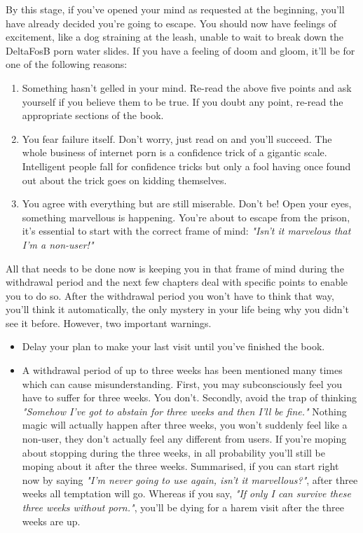 \documentclass[easypeasy]{subfiles}
\begin{document}
By this stage, if you've opened your mind as requested at the beginning, you'll have already decided you're going to escape. You should now have feelings of excitement, like a dog straining at the leash, unable to wait to break down the DeltaFosB porn water slides. If you have a feeling of doom and gloom, it'll be for one of the following reasons:
\begin{enumerate}
  \item Something hasn't gelled in your mind. Re-read the above five points and ask yourself if you believe them to be true. If you doubt any point, re-read the appropriate sections of the book.

  \item You fear failure itself. Don't worry, just read on and you'll succeed. The whole business of internet porn is a confidence trick of a gigantic scale. Intelligent people fall for confidence tricks but only a fool having once found out about the trick goes on kidding themselves.

  \item You agree with everything but are still miserable. Don't be! Open your eyes, something marvellous is happening. You're about to escape from the prison, it's essential to start with the correct frame of mind: \textit{"Isn't it marvelous that I'm a non-user!"}
  \end{enumerate}

All that needs to be done now is keeping you in that frame of mind during the withdrawal period and the next few chapters deal with specific points to enable you to do so. After the withdrawal period you won't have to think that way, you'll think it automatically, the only mystery in your life being why you didn't see it before. However, two important warnings.

  \begin{itemize}
  \item Delay your plan to make your last visit until you've finished the book.
  \item A withdrawal period of up to three weeks has been mentioned many times which can cause misunderstanding. First, you may subconsciously feel you have to suffer for three weeks. You don't. Secondly, avoid the trap of thinking \textit{"Somehow I've got to abstain for three weeks and then I'll be fine."} Nothing magic will actually happen after three weeks, you won't suddenly feel like a non-user, they don't actually feel any different from users. If you're moping about stopping during the three weeks, in all probability you'll still be moping about it after the three weeks. Summarised, if you can start right now by saying \textit{"I'm never going to use again, isn't it marvellous?"}, after three weeks all temptation will go. Whereas if you say, \textit{"If only I can survive these three weeks without porn."}, you'll be dying for a harem visit after the three weeks are up.
  \end{itemize}
\end{document}
